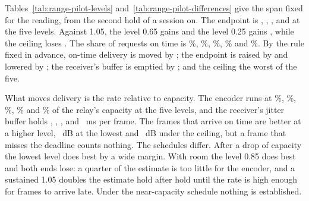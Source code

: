 \begin{table}[t]
\centering\small
\resizebox{\linewidth}{!}{}
\caption{Development pilot. Mean over sources of each whole-session level, from the second hold on. Utility is the endpoint, the on-time sampled PSNR contribution per capture request. The ceiling is a cap of 4~Mbit/s throughout.}
\label{tab:range-pilot-levels}
\end{table}

\begin{table}[t]
\centering\small
\resizebox{\linewidth}{!}{}
\caption{Development pilot. Each level minus the level 1.05, within source and schedule, with 95\% $t$ intervals over sources; not corrected for the number of comparisons.}
\label{tab:range-pilot-differences}
\end{table}

Tables~\ref{tab:range-pilot-levels} and~\ref{tab:range-pilot-differences} give the span fixed for the reading, from the second hold of a session on. The endpoint is \RangePilotUtilityQuarter, \RangePilotUtilityLow, \RangePilotUtilityMid, \RangePilotUtilityTop{} and \RangePilotUtilityCeiling{} at the five levels. Against 1.05, the level 0.65 gains \RangePilotUtilityDiffLow{} \RangePilotUtilityDiffLowT{} and the level 0.25 gains \RangePilotUtilityDiffQuarter{} \RangePilotUtilityDiffQuarterT, while the ceiling loses \RangePilotUtilityDiffCeiling{} \RangePilotUtilityDiffCeilingT. The share of requests on time is \RangePilotOnTimeQuarter\%, \RangePilotOnTimeLow\%, \RangePilotOnTimeMid\%, \RangePilotOnTimeTop\% and \RangePilotOnTimeCeiling\%. By the rule fixed in advance, on-time delivery is moved by \RangePilotMoves; the endpoint is raised by \RangePilotPays{} and lowered by \RangePilotCosts; the receiver's buffer is emptied by \RangePilotEmpties; and the ceiling \RangePilotCeilingWorst{} the worst of the five.

What moves delivery is the rate relative to capacity. The encoder runs at \RangePilotRateShareQuarter\%, \RangePilotRateShareLow\%, \RangePilotRateShareMid\%, \RangePilotRateShareTop\% and \RangePilotRateShareCeiling\% of the relay's capacity at the five levels, and the receiver's jitter buffer holds \RangePilotBufferQuarter, \RangePilotBufferLow, \RangePilotBufferMid, \RangePilotBufferTop{} and \RangePilotBufferCeiling~ms per frame. The frames that arrive on time are better at a higher level, \RangePilotPsnrQuarter~dB at the lowest and \RangePilotPsnrCeiling~dB under the ceiling, but a frame that misses the deadline counts nothing. The schedules differ. After a drop of capacity the lowest level does best by a wide margin. With room the level 0.85 does best and both ends lose: a quarter of the estimate is too little for the encoder, and a sustained 1.05 doubles the estimate hold after hold until the rate is high enough for frames to arrive late. Under the near-capacity schedule nothing is established.

